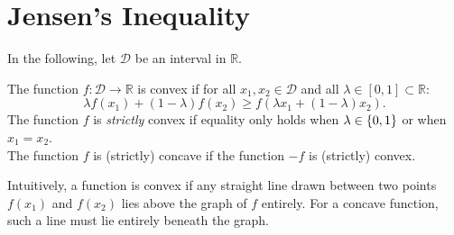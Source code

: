 \section{Jensen's Inequality}
In the following, let $\mathcal{D}$ be an interval in $\mathbb{R}$.

\begin{definition}
The function $f : \mathcal{D} \to \mathbb{R}$ is convex if for all $x_1, x_2 \in \mathcal{D}$ and all $\lambda \in [0,1] \subset \mathbb{R}$:
\[
\lambda f(x_1) + (1-\lambda)f(x_2) \geq f(\lambda x_1 + (1-\lambda)x_2).
\]
The function $f$ is \emph{strictly} convex if equality only holds when $\lambda \in \{0,1\}$ or when $x_1 = x_2$.
\\The function $f$ is (strictly) concave if the function $-f$ is (strictly) convex.
\end{definition}
Intuitively, a function is convex if any straight line drawn between two points $f(x_1)$ and $f(x_2)$ lies above the graph of $f$ entirely. For a concave function, such a line must lie entirely beneath the graph.
